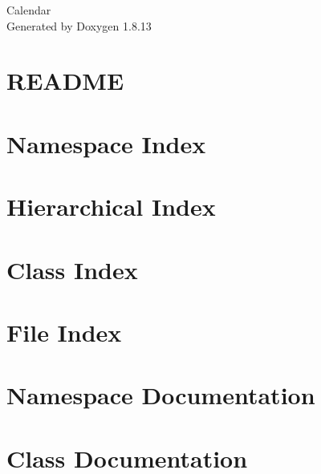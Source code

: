 \documentclass[twoside]{book}
\newcommand{\+}{\discretionary{\mbox{\scriptsize$\hookleftarrow$}}{}{}}
\newcommand{\clearemptydoublepage}{%
  \newpage{\pagestyle{empty}\cleardoublepage}%
}
\begin{document}
\hypersetup{pageanchor=false,
             bookmarksnumbered=true,
             pdfencoding=unicode
            }
\begin{titlepage}
\vspace*{7cm}
\begin{center}%
{\Large Calendar }\\
\vspace*{1cm}
{\large Generated by Doxygen 1.8.13}\\
\end{center}
\end{titlepage}
\clearemptydoublepage
{}
\tableofcontents
\clearemptydoublepage
{}
\hypersetup{pageanchor=true}

\chapter{R\+E\+A\+D\+ME}
\label{md_README}

\chapter{Namespace Index}

\chapter{Hierarchical Index}

\chapter{Class Index}

\chapter{File Index}

\chapter{Namespace Documentation}

\chapter{Class Documentation}


























\end{document}
